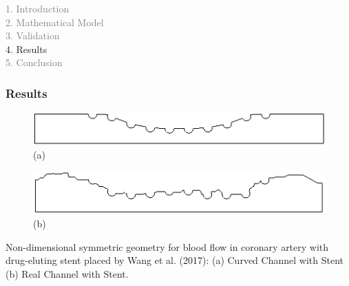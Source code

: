 
\begin{frame}
  \vspace{-1cm}
  \textcolor{gray}{1. Introduction}\\[0.1cm]
  \textcolor{gray}{2. Mathematical Model}\\[0.1cm]
  \textcolor{gray}{3. Validation}\\[0.1cm]
  4. Results\\[0.1cm]
  \textcolor{gray}{5. Conclusion}
\end{frame}



\begin{frame}
 \frametitle{\LARGE Results}
\begin{figure}
  \vspace{-1cm}
     \centering
     \begin{minipage}{.45\linewidth}
      \centering
      \includegraphics[scale=0.15]{images/CurvedStrut.png}\\
      \scriptsize (a)
     \end{minipage}%
     \begin{minipage}{.45\linewidth}
      \centering
      \includegraphics[scale=0.15]{images/RealStrut.png}\\
      \scriptsize (b)
     \end{minipage}
\end{figure}
\vspace{-0.3cm}
\begin{center}
\scriptsize 
     Non-dimensional symmetric geometry for blood flow in coronary artery with drug-eluting stent placed by Wang et al. (2017):
     (a) Curved Channel with Stent
     (b) Real Channel with Stent.
\end{center}
\vspace{0.05cm}
\small
\begin{center}
\begin{columns}[c]

\end{columns}
\end{center}
\end{frame}
